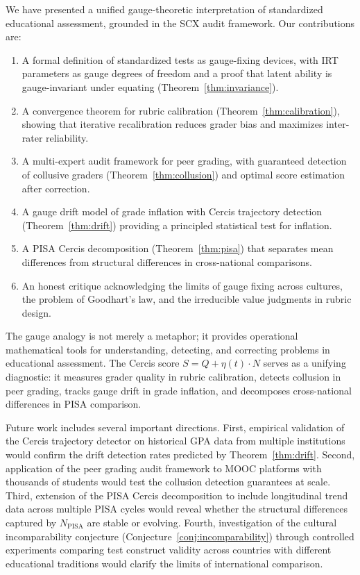 \documentclass[12pt,a4paper]{article}
\theoremstyle{remark}
\begin{document}
We have presented a unified gauge-theoretic interpretation of standardized educational assessment, grounded in the SCX audit framework. Our contributions are:

\begin{enumerate}
    \item A formal definition of standardized tests as gauge-fixing devices, with IRT parameters as gauge degrees of freedom and a proof that latent ability is gauge-invariant under equating (Theorem~\ref{thm:invariance}).

    \item A convergence theorem for rubric calibration (Theorem~\ref{thm:calibration}), showing that iterative recalibration reduces grader bias and maximizes inter-rater reliability.

    \item A multi-expert audit framework for peer grading, with guaranteed detection of collusive graders (Theorem~\ref{thm:collusion}) and optimal score estimation after correction.

    \item A gauge drift model of grade inflation with Cercis trajectory detection (Theorem~\ref{thm:drift}) providing a principled statistical test for inflation.

    \item A PISA Cercis decomposition (Theorem~\ref{thm:pisa}) that separates mean differences from structural differences in cross-national comparisons.

    \item An honest critique acknowledging the limits of gauge fixing across cultures, the problem of Goodhart's law, and the irreducible value judgments in rubric design.
\end{enumerate}

The gauge analogy is not merely a metaphor; it provides operational mathematical tools for understanding, detecting, and correcting problems in educational assessment. The Cercis score $S = Q + \eta(t) \cdot N$ serves as a unifying diagnostic: it measures grader quality in rubric calibration, detects collusion in peer grading, tracks gauge drift in grade inflation, and decomposes cross-national differences in PISA comparison.

Future work includes several important directions. First, empirical validation of the Cercis trajectory detector on historical GPA data from multiple institutions would confirm the drift detection rates predicted by Theorem~\ref{thm:drift}. Second, application of the peer grading audit framework to MOOC platforms with thousands of students would test the collusion detection guarantees at scale. Third, extension of the PISA Cercis decomposition to include longitudinal trend data across multiple PISA cycles would reveal whether the structural differences captured by $N_{\text{PISA}}$ are stable or evolving. Fourth, investigation of the cultural incomparability conjecture (Conjecture~\ref{conj:incomparability}) through controlled experiments comparing test construct validity across countries with different educational traditions would clarify the limits of international comparison.
\end{document}
